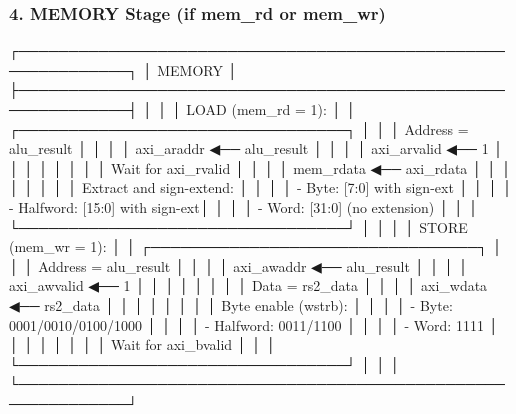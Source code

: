 \subsubsection{4. MEMORY Stage (if mem\_rd or mem\_wr)}\label{cr:fix:cpu-dataflow-diagram:4-memory-stage-if-mem-rd-or-mem-wr}

\begin{record}

\begin{textblock}
┌─────────────────────────────────────────────────────────────┐
│                      MEMORY                                 │
├─────────────────────────────────────────────────────────────┤
│                                                             │
│  LOAD (mem_rd = 1):                                         │
│  ┌─────────────────────────────────┐                        │
│  │ Address = alu_result            │                        │
│  │ axi_araddr ◀── alu_result       │                        │
│  │ axi_arvalid ◀── 1               │                        │
│  │                                 │                        │
│  │ Wait for axi_rvalid             │                        │
│  │ mem_rdata ◀── axi_rdata         │                        │
│  │                                 │                        │
│  │ Extract and sign-extend:        │                        │
│  │ - Byte: [7:0] with sign-ext     │                        │
│  │ - Halfword: [15:0] with sign-ext│                        │
│  │ - Word: [31:0] (no extension)   │                        │
│  └─────────────────────────────────┘                        │
│                                                             │
│  STORE (mem_wr = 1):                                        │
│  ┌─────────────────────────────────┐                        │
│  │ Address = alu_result            │                        │
│  │ axi_awaddr ◀── alu_result       │                        │
│  │ axi_awvalid ◀── 1               │                        │
│  │                                 │                        │
│  │ Data = rs2_data                 │                        │
│  │ axi_wdata ◀── rs2_data          │                        │
│  │                                 │                        │
│  │ Byte enable (wstrb):            │                        │
│  │ - Byte: 0001/0010/0100/1000     │                        │
│  │ - Halfword: 0011/1100           │                        │
│  │ - Word: 1111                    │                        │
│  │                                 │                        │
│  │ Wait for axi_bvalid             │                        │
│  └─────────────────────────────────┘                        │
│                                                             │
└─────────────────────────────────────────────────────────────┘
\end{textblock}

\end{record}

